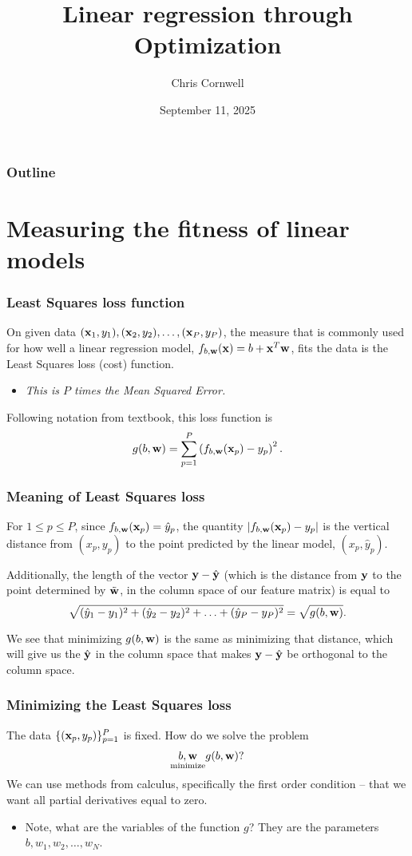 \documentclass{beamer}
\author{Chris Cornwell}
\date{September 11, 2025}
\title{Linear regression through Optimization}
\theoremstyle{example}
\begin{document}
\begin{frame}
\titlepage
\end{frame}

\begin{frame}
\frametitle{Outline}
\tableofcontents
\end{frame}

\section{Measuring the fitness of linear models}

\begin{frame}
    \frametitle{Least Squares loss function}
    On given data $({\bf x}_1, y_1), ({\bf x}_2, y_2), \ldots, ({\bf x}_P, y_P)$, the measure that is commonly used for how well a linear regression model, $f_{b,{\bf w}}({\bf x}) = b + {\bf x}^T{\bf w}$, fits the data is the Least Squares loss (cost) function. 
    \vspace*{-8pt}
    \begin{itemize}
        \item \textit{This is $P$ times the Mean Squared Error.}
    \end{itemize}

    Following notation from textbook, this loss function is 
        \[g(b, {\bf w}) = \sum_{p=1}^P\left(f_{b,{\bf w}}({\bf x}_p) - y_p\right)^2.\]
    
\end{frame}

\begin{frame}
    \frametitle{Meaning of Least Squares loss}
    For $1\le p\le P$, since $f_{b,{\bf w}}({\bf x}_p) = \hat{y}_p$, the quantity $|f_{b,{\bf w}}({\bf x}_p) - y_p|$ is the vertical distance from $(x_p, y_p)$ to the point predicted by the linear model, $(x_p, \hat{y}_p)$. 

    Additionally, the length of the vector ${\bf y} - \hat{\bf y}$ (which is the distance from ${\bf y}$ to the point determined by $\tilde{\bf w}$, in the column space of our feature matrix) is equal to 
        \[\sqrt{(\hat{y}_1 - y_1)^2 + (\hat{y}_2 - y_2)^2 + \ldots + (\hat{y}_P - y_P)^2} = \sqrt{g(b, {\bf w})}.\]

    We see that minimizing $g(b, {\bf w})$ is the same as minimizing that distance, which will give us the $\hat{\bf y}$ in the column space that makes ${\bf y} - \hat{\bf y}$ be orthogonal to the column space.
\end{frame}

\begin{frame}
    \frametitle{Minimizing the Least Squares loss}
    The data $\{({\bf x}_p, y_p)\}_{p=1}^P$ is fixed. How do we solve the problem 
                \[\underset{\text{minimize}}{b,{\bf w}} g(b, {\bf w})?\]
    We can use methods from calculus, specifically the first order condition {--} that we want all partial derivatives equal to zero. 
    \begin{itemize}
        \item Note, what are the variables of the function $g$?  They are the parameters $b,w_1,w_2,\ldots,w_N$.
    \end{itemize}
\end{frame}
\end{document}
